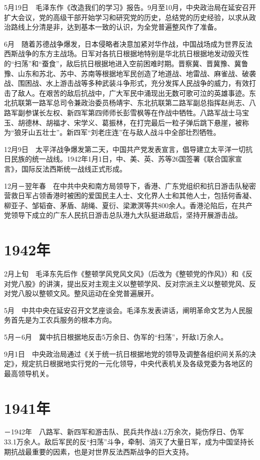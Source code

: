 \documentclass[10pt,a4paper,twocolumn]{book}
\begin{document}
5月19日　毛泽东作《改造我们的学习》报告。9月至10月，中央政治局在延安召开扩大会议，党的高级干部开始学习和研究党的历史，总结党的历史经验，以求从政治路线上分清是非，达到基本一致的认识，为全党普遍整风作了准备。

6月　随着苏德战争爆发，日本侵略者决意加紧对华作战，中国战场成为世界反法西斯战争的东方主战场。日军对各抗日根据地特别是华北抗日根据地发动毁灭性的“扫荡”和“蚕食”，敌后抗日根据地进入空前困难时期。晋察冀、晋冀豫、冀鲁豫、山东和苏北、苏中、苏南等根据地军民创造了地道战、地雷战、麻雀战、破袭战、围困战、水上游击战等多种武装斗争形式，充分发挥人民战争的威力，有效打击了敌人。在艰苦的敌后抗战中，广大军民中涌现出无数可歌可泣的英雄事迹。东北抗联第一路军总司令兼政治委员杨靖宇、东北抗联第二路军副总指挥赵尚志、八路军副参谋长左权、新四军第四师师长彭雪枫等在作战中牺牲。八路军战士马宝玉、胡德林、胡福才、宋学义、葛振林，在打完最后一粒子弹后跳下悬崖，被称为“狼牙山五壮士”。新四军“刘老庄连”在与敌人战斗中全部壮烈牺牲。

12月9日　太平洋战争爆发第二天，中国共产党发表宣言，倡导建立太平洋一切抗日民族的统一战线。1942年1月1日，中、美、英、苏等26国签署《联合国家宣言》，国际反法西斯统一战线正式形成。

12月－翌年春　在中共中央和南方局领导下，香港、广东党组织和抗日游击队秘密营救日军占领香港时被困的爱国民主人士、文化界人士和其他人士，包括何香凝、柳亚子、邹韬奋、茅盾、胡绳、夏衍、梁漱溟等共800余人。香港沦陷后，在共产党领导下成立的广东人民抗日游击总队港九大队挺进敌后，坚持开展游击战。

\section{1942年}

2月上旬　毛泽东先后作《整顿学风党风文风》（后改为《整顿党的作风》）和《反对党八股》的讲演，提出反对主观主义以整顿学风、反对宗派主义以整顿党风、反对党八股以整顿文风。整风运动在全党普遍展开。

5月　中共中央在延安召开文艺座谈会。毛泽东发表讲话，阐明革命文艺为人民服务首先是为工农兵服务的根本方向。

5月－6月　冀中抗日根据地反击5万余日、伪军的“扫荡”，歼敌1万余人。

9月1日　中央政治局通过《关于统一抗日根据地党的领导及调整各组织间关系的决定》，规定抗日根据地实行党的一元化领导，中央代表机关及各级党委为各地区的最高领导机关。

\section{1941年}－1942年　八路军、新四军和游击队、民兵共作战4.2万余次，毙伤俘日、伪军33.1万余人。敌后军民的反“扫荡”斗争，牵制、消灭了大量日军，成为中国坚持长期抗战最重要的因素，也是对世界反法西斯战争的巨大支持。
\end{document}
